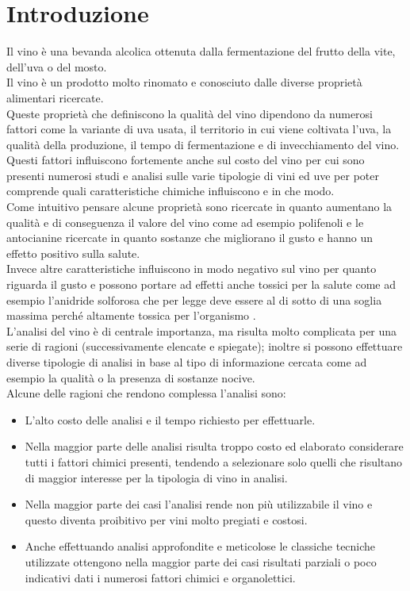 \chapter{Introduzione}
\label{ch:introduzione}

Il vino è una bevanda alcolica ottenuta dalla fermentazione del frutto della vite, dell'uva o del mosto.\\
Il vino è un prodotto molto rinomato e conosciuto dalle diverse proprietà alimentari ricercate.\\
Queste proprietà che definiscono la qualità del vino dipendono da numerosi fattori come la variante di uva usata, il territorio in cui viene coltivata l'uva, la qualità della produzione, il tempo di fermentazione e di invecchiamento del vino.\\
Questi fattori influiscono fortemente anche sul costo del vino per cui sono presenti numerosi studi e analisi sulle varie tipologie di vini ed uve per poter comprende quali caratteristiche chimiche influiscono e in che modo.\\
Come intuitivo pensare alcune proprietà sono ricercate in quanto aumentano la qualità e di conseguenza il valore del vino come ad esempio polifenoli e le antocianine ricercate in quanto sostanze che migliorano il gusto e hanno un effetto positivo sulla salute.\\
Invece altre caratteristiche influiscono in modo negativo sul vino per quanto riguarda il gusto e possono portare ad effetti anche tossici per la salute come ad esempio l'anidride solforosa che per legge deve essere al di sotto di una soglia massima perché altamente tossica per l'organismo \cite{wikipedia:vino}.\\
L'analisi del vino è di centrale importanza, ma risulta molto complicata per una serie di ragioni (successivamente elencate e spiegate); inoltre si possono effettuare diverse tipologie di analisi in base al tipo di informazione cercata come ad esempio la qualità o la presenza di sostanze nocive.\\
Alcune delle ragioni che rendono complessa l'analisi sono:

\begin{itemize}
    \item L'alto costo delle analisi e il tempo richiesto per effettuarle.
    \item Nella maggior parte delle analisi risulta troppo costo ed elaborato considerare tutti i fattori chimici presenti, tendendo a selezionare solo quelli che risultano di maggior interesse per la tipologia di vino in analisi.
    \item Nella maggior parte dei casi l'analisi rende non più utilizzabile il vino e questo diventa proibitivo per vini molto pregiati e costosi.
    \item Anche effettuando analisi approfondite e meticolose le classiche tecniche utilizzate ottengono nella maggior parte dei casi risultati parziali o poco indicativi dati i numerosi fattori chimici e organolettici.
\end{itemize}

